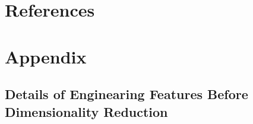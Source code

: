 \documentclass[11pt]{article}
\begin{document}
\section*{References}


\section*{Appendix}
\subsection{Details of Enginearing Features Before Dimensionality Reduction}
\label{subsec:feature_engineering}

\end{document}
